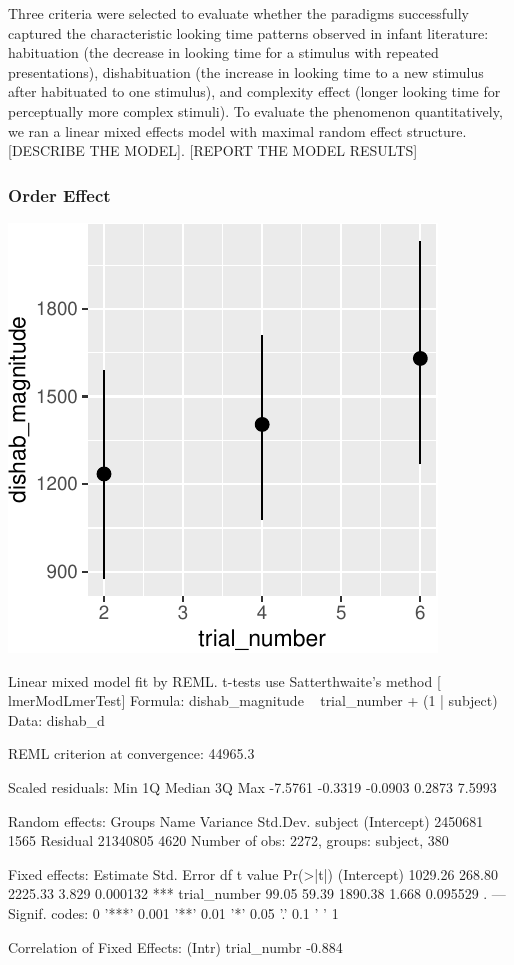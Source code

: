 \documentclass[10pt, letterpaper]{article}
\newenvironment{CodeChunk}{}{}
\begin{document}
Three criteria were selected to evaluate whether the paradigms
successfully captured the characteristic looking time patterns observed
in infant literature: habituation (the decrease in looking time for a
stimulus with repeated presentations), dishabituation (the increase in
looking time to a new stimulus after habituated to one stimulus), and
complexity effect (longer looking time for perceptually more complex
stimuli). To evaluate the phenomenon quantitatively, we ran a linear
mixed effects model with maximal random effect structure. {[}DESCRIBE
THE MODEL{]}. {[}REPORT THE MODEL RESULTS{]}

\hypertarget{order-effect}{%
\subsubsection{Order Effect}\label{order-effect}}

\begin{CodeChunk}

\includegraphics{figs/unnamed-chunk-9-1} \begin{CodeOutput}
Linear mixed model fit by REML. t-tests use Satterthwaite's method [
lmerModLmerTest]
Formula: dishab_magnitude ~ trial_number + (1 | subject)
   Data: dishab_d

REML criterion at convergence: 44965.3

Scaled residuals: 
    Min      1Q  Median      3Q     Max 
-7.5761 -0.3319 -0.0903  0.2873  7.5993 

Random effects:
 Groups   Name        Variance Std.Dev.
 subject  (Intercept)  2450681 1565    
 Residual             21340805 4620    
Number of obs: 2272, groups:  subject, 380

Fixed effects:
             Estimate Std. Error      df t value Pr(>|t|)    
(Intercept)   1029.26     268.80 2225.33   3.829 0.000132 ***
trial_number    99.05      59.39 1890.38   1.668 0.095529 .  
---
Signif. codes:  0 '***' 0.001 '**' 0.01 '*' 0.05 '.' 0.1 ' ' 1

Correlation of Fixed Effects:
            (Intr)
trial_numbr -0.884
\end{CodeOutput}
\end{CodeChunk}
\end{document}
